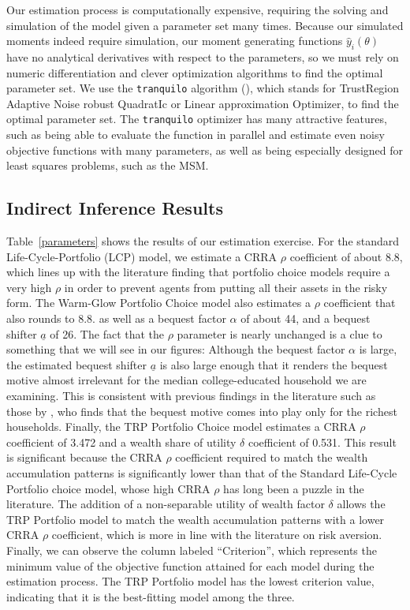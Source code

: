 \documentclass{article}
\newcommand{\CRRA}{\rho}
\begin{document}
Our estimation process is computationally expensive, requiring the solving and simulation of the model given a parameter set many times.
Because our simulated moments indeed require simulation, our moment generating functions $\hat{y}_i(\theta)$ have no analytical derivatives with respect to the parameters, so we must rely on numeric differentiation and clever optimization algorithms to find the optimal parameter set.
We use the \texttt{tranquilo} algorithm (\cite{Gabler2024}), which stands for TrustRegion Adaptive Noise robust QuadratIc or Linear approximation Optimizer, to find the optimal parameter set.
The \texttt{tranquilo} optimizer has many attractive features, such as being able to evaluate the function in parallel and estimate even noisy objective functions with many parameters, as well as being especially designed for least squares problems, such as the MSM.

\subsection{Indirect Inference Results}

Table~\ref{parameters} shows the results of our estimation exercise.
For the standard Life-Cycle-Portfolio (LCP) model, we estimate a CRRA $\CRRA$ coefficient of about 8.8, which lines up with the literature finding that portfolio choice models require a very high $\CRRA$ in order to prevent agents from putting all their assets in the risky form.
The Warm-Glow Portfolio Choice model also estimates a $\CRRA$ coefficient that also rounds to 8.8.
as well as a bequest factor $\alpha$ of about 44, and a bequest shifter $\underline{a}$ of 26.
The fact that the $\CRRA$ parameter is nearly unchanged is a clue to something that we will see in our figures: Although the bequest factor $\alpha$ is large, the estimated bequest shifter $\underline{a}$ is also large enough that it renders the bequest motive almost irrelevant for the median college-educated household we are examining.
This is consistent with previous findings in the literature such as those by \cite{deNardiBequest}, who finds that the bequest motive comes into play only for the richest households.
Finally, the TRP Portfolio Choice model estimates a CRRA $\CRRA$ coefficient of 3.472 and a wealth share of utility $\delta$ coefficient of 0.531.
This result is significant because the CRRA $\CRRA$ coefficient required to match the wealth accumulation patterns is significantly lower than that of the Standard Life-Cycle Portfolio choice model, whose high CRRA $\CRRA$ has long been a puzzle in the literature.
The addition of a non-separable utility of wealth factor $\delta$ allows the TRP Portfolio model to match the wealth accumulation patterns with a lower CRRA $\CRRA$ coefficient, which is more in line with the literature on risk aversion.
Finally, we can observe the column labeled ``Criterion'', which represents the minimum value of the objective function attained for each model during the estimation process.
The TRP Portfolio model has the lowest criterion value, indicating that it is the best-fitting model among the three.
\end{document}
